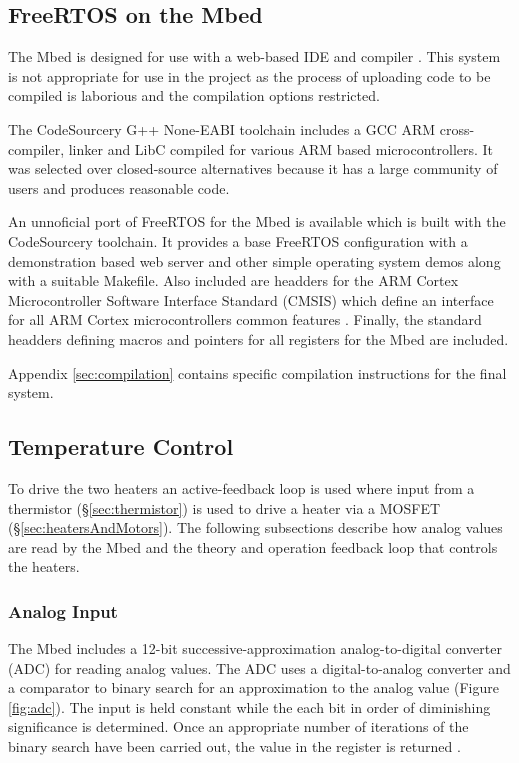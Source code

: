 		\subsection{FreeRTOS on the Mbed}
			
			\label{sec:compiler}
			
			The Mbed is designed for use with a web-based IDE and compiler
			\cite{mbedcompiler}. This system is not appropriate for use in the project
			as the process of uploading code to be compiled is laborious and the
			compilation options restricted.
			
			The CodeSourcery G++ None-EABI toolchain includes a GCC ARM cross-compiler,
			linker and LibC compiled for various ARM based microcontrollers. It was
			selected over closed-source alternatives because it has a large community of
			users and produces reasonable code.
			
			An unnoficial port of FreeRTOS for the Mbed is available which is built
			with the CodeSourcery toolchain. It provides a base FreeRTOS configuration
			with a demonstration \uIP{} based web server and other simple operating
			system demos along with a suitable Makefile. Also included are headders
			for the ARM Cortex Microcontroller Software Interface Standard (CMSIS)
			which define an interface for all ARM Cortex microcontrollers common
			features \cite{cmsis}. Finally, the standard headders defining macros and
			pointers for all registers for the Mbed are included.
			
			Appendix \ref{sec:compilation} contains specific compilation instructions
			for the final system.
		
		\subsection{Temperature Control}
			
			To drive the two heaters an active-feedback loop is used where input from
			a thermistor (\S \ref{sec:thermistor}) is used to drive a heater via a
			MOSFET (\S \ref{sec:heatersAndMotors}). The following subsections describe
			how analog values are read by the Mbed and the theory and operation
			feedback loop that controls the heaters.
			
			\subsubsection{Analog Input}
				
				The Mbed includes a 12-bit successive-approximation analog-to-digital
				converter (ADC) for reading analog values\cite{lpc1768}. The ADC uses a
				digital-to-analog converter and a comparator to binary search for an
				approximation to the analog value (Figure \ref{fig:adc}). The input is
				held constant while the each bit in order of diminishing significance is
				determined. Once an appropriate number of iterations of the binary
				search have been carried out, the value in the register is returned
				\cite{maximadc}.
				
